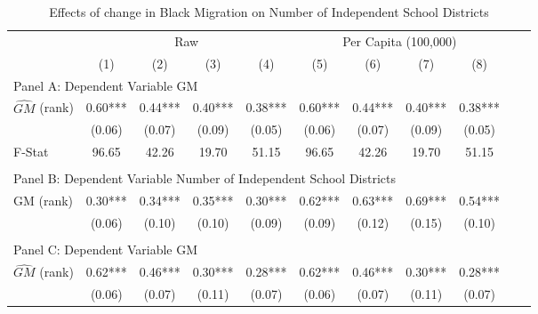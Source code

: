  \begin{table}[htbp]\centering {} \begin{threeparttable} \caption{Effects of change in Black Migration on Number of Independent School Districts} \begin{tabular}{l*{10}{c}} \toprule
                &\multicolumn{4}{c}{Raw}                                    &\multicolumn{4}{c}{Per Capita (100,000)}                   \\\cmidrule(lr){2-5}\cmidrule(lr){6-9}
                &\multicolumn{1}{c}{(1)}   &\multicolumn{1}{c}{(2)}   &\multicolumn{1}{c}{(3)}   &\multicolumn{1}{c}{(4)}   &\multicolumn{1}{c}{(5)}   &\multicolumn{1}{c}{(6)}   &\multicolumn{1}{c}{(7)}   &\multicolumn{1}{c}{(8)}   \\
\cmidrule(lr){1-9}
\multicolumn{8}{l}{Panel A: Dependent Variable GM}\\
\cmidrule(lr){1-9}
$\hat{GM}$ (rank)&       0.60***&       0.44***&       0.40***&       0.38***&       0.60***&       0.44***&       0.40***&       0.38***\\
                &     (0.06)   &     (0.07)   &     (0.09)   &     (0.05)   &     (0.06)   &     (0.07)   &     (0.09)   &     (0.05)   \\
\midrule
F-Stat          &      96.65   &      42.26   &      19.70   &      51.15   &      96.65   &      42.26   &      19.70   &      51.15   \\
\cmidrule[\heavyrulewidth](lr){1-9} \\ \cmidrule[\heavyrulewidth](lr){1-9}
\multicolumn{8}{l}{Panel B: Dependent Variable Number of Independent School Districts}\\
\cmidrule(lr){1-9}
GM  (rank)      &       0.30***&       0.34***&       0.35***&       0.30***&       0.62***&       0.63***&       0.69***&       0.54***\\
                &     (0.06)   &     (0.10)   &     (0.10)   &     (0.09)   &     (0.09)   &     (0.12)   &     (0.15)   &     (0.10)   \\
\cmidrule[\heavyrulewidth](lr){1-9} \\ \cmidrule[\heavyrulewidth](lr){1-9}
\multicolumn{8}{l}{Panel C: Dependent Variable GM}\\
\cmidrule(lr){1-9}
$\hat{GM}$ (rank)&       0.62***&       0.46***&       0.30***&       0.28***&       0.62***&       0.46***&       0.30***&       0.28***\\
                &     (0.06)   &     (0.07)   &     (0.11)   &     (0.07)   &     (0.06)   &     (0.07)   &     (0.11)   &     (0.07)   \\

\end{tabular}
\end{threeparttable}
\end{table}
